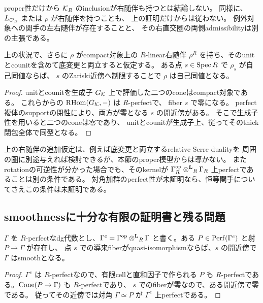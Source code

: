 \begin{remark}[両側admissibilityは追加条件]
 proper性だけから \(\mathcal K_R\) のinclusionが右随伴も持つとは結論しない。
 同様に、\(L_{\mathcal O_B}\) または \(\rho\) が右随伴を持つことも、
 上の証明だけからは従わない。
 例外対象への関手の左右随伴が存在することと、
 その右直交圏の両側admissibilityは別の主張である。
\end{remark}

\begin{lemma}[随伴が与えられた場合のrotationの開性]
\label{lem:relative-rotation-open-conditional}
 上の状況で、さらに \(\rho\) がcompact対象上の \(R\)-linear右随伴
 \(\rho^R\) を持ち、そのunitとcounitを含めて底変更と両立すると仮定する。
 ある点 \(s\in\operatorname{Spec} R\) で \(\rho_s\) が自己同値ならば、
 \(s\) のZariski近傍へ制限することで \(\rho\) は自己同値となる。
\end{lemma}

\begin{proof}
 unitとcounitを生成子 \(G_{\mathcal K}\) 上で評価した二つのconeはcompact対象である。
 これらからの \(\operatorname{RHom}(G_{\mathcal K},-)\) は \(R\)-perfectで、
 fiber \(s\) で零になる。
 perfect複体のsupportの閉性により、両方が零となる \(s\) の開近傍がある。
 そこで生成子性を用いると二つのconeは零であり、
 unitとcounitが生成子上、従ってそのthick閉包全体で同型となる。
\end{proof}

上の右随伴の追加仮定は、例えば底変更と両立するrelative Serre dualityを
周囲の圏に別途与えれば検討できるが、本節のproper模型からは導かない。
またrotationの可逆性が分かった場合でも、そのkernelが
\(\Gamma_R^{\mathrm{op}}\mathbin{\otimes^{\mathbf L}}_R\Gamma_R\) 上perfectであることは別の条件である。
対角加群のperfect性が未証明なら、恒等関手についてさえこの条件は未証明である。

\subsection{smoothnessに十分な有限の証明書と残る問題}

\begin{lemma}[対角の有限証明書]\label{lem:relative-diagonal-certificate}
 \(\Gamma\) を \(R\)-perfectなdg代数とし、\(\Gamma^e=\Gamma^{\mathrm{op}}\mathbin{\otimes^{\mathbf L}}_R\Gamma\)
 と書く。ある \(P\in\operatorname{Perf}(\Gamma^e)\) と射 \(P\to\Gamma\) が存在し、
 点 \(s\) での導来fiberがquasi-isomorphismならば、\(s\) の開近傍で \(\Gamma\) はsmoothとなる。
\end{lemma}

\begin{proof}
 \(\Gamma^e\) は \(R\)-perfectなので、有限cellと直和因子で作られる \(P\) も
 \(R\)-perfectである。\(\operatorname{Cone}(P\to\Gamma)\) も \(R\)-perfectであり、
 \(s\) でのfiberが零なので、ある開近傍で零である。
 従ってその近傍では対角 \(\Gamma\simeq P\) が \(\Gamma^e\) 上perfectである。
\end{proof}

